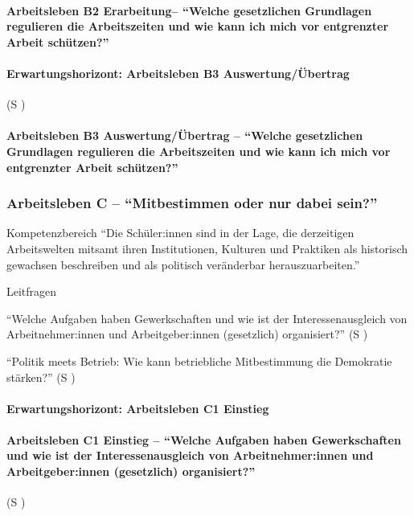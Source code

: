 \paragraph{Arbeitsleben B2 Erarbeitung-- \enquote{Welche gesetzlichen Grundlagen regulieren die Arbeitszeiten und wie kann ich mich vor entgrenzter Arbeit schützen?}}



\paragraph{Erwartungshorizont: Arbeitsleben B3 Auswertung/Übertrag} (\gls{S} \pageref{ARBEITSLEBEN-B3})

\paragraph{Arbeitsleben B3 Auswertung/Übertrag -- \enquote{Welche gesetzlichen Grundlagen regulieren die Arbeitszeiten und wie kann ich mich vor entgrenzter Arbeit schützen?}}





\subsubsection{Arbeitsleben C -- \enquote{Mitbestimmen oder nur dabei sein?}}
Kompetenzbereich
\enquote{Die Schüler:innen sind in der Lage, die derzeitigen Arbeitswelten mitsamt ihren Institutionen, Kulturen und Praktiken als historisch gewachsen beschreiben und als politisch veränderbar herauszuarbeiten.}


Leitfragen
\begin{myitemize}
    \item \enquote{Welche Aufgaben haben Gewerkschaften und wie ist der Interessenausgleich von Arbeitnehmer:innen und Arbeitgeber:innen (gesetzlich) organisiert?} (\gls{S} \pageref{ARBEITSLEBEN-C1})
    \item \enquote{Politik meets Betrieb: Wie kann betriebliche Mitbestimmung die Demokratie stärken?} (\gls{S} \pageref{ARBEITSLEBEN-C2})
\end{myitemize}

\paragraph{Erwartungshorizont: Arbeitsleben C1 Einstieg}

\paragraph{Arbeitsleben C1 Einstieg -- \enquote{Welche Aufgaben haben Gewerkschaften und wie ist der Interessenausgleich von Arbeitnehmer:innen und Arbeitgeber:innen (gesetzlich) organisiert?}} (\gls{S} \pageref{ARBEITSLEBEN-C1})



